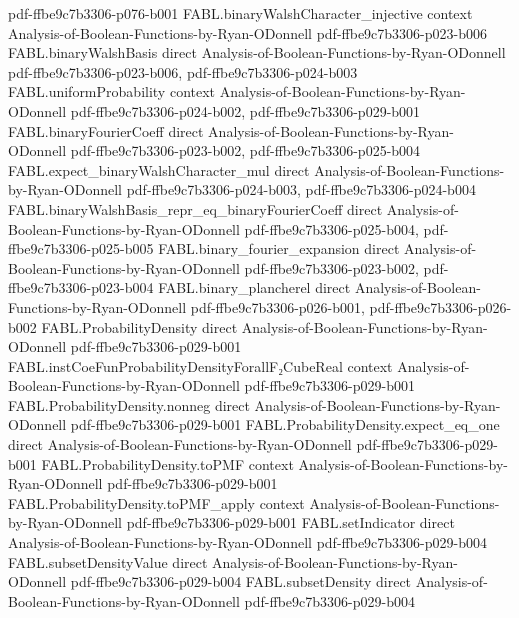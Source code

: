 \begin{theorem}
  {pdf-ffbe9c7b3306-p076-b001}
\proofstep
  {FABL.binaryWalshCharacter_injective}
  {context}
  {Analysis-of-Boolean-Functions-by-Ryan-ODonnell}
  {pdf-ffbe9c7b3306-p023-b006}
\proofstep
  {FABL.binaryWalshBasis}
  {direct}
  {Analysis-of-Boolean-Functions-by-Ryan-ODonnell}
  {pdf-ffbe9c7b3306-p023-b006,
    pdf-ffbe9c7b3306-p024-b003}
\proofstep
  {FABL.uniformProbability}
  {context}
  {Analysis-of-Boolean-Functions-by-Ryan-ODonnell}
  {pdf-ffbe9c7b3306-p024-b002,
    pdf-ffbe9c7b3306-p029-b001}
\proofstep
  {FABL.binaryFourierCoeff}
  {direct}
  {Analysis-of-Boolean-Functions-by-Ryan-ODonnell}
  {pdf-ffbe9c7b3306-p023-b002,
    pdf-ffbe9c7b3306-p025-b004}
\proofstep
  {FABL.expect_binaryWalshCharacter_mul}
  {direct}
  {Analysis-of-Boolean-Functions-by-Ryan-ODonnell}
  {pdf-ffbe9c7b3306-p024-b003,
    pdf-ffbe9c7b3306-p024-b004}
\proofstep
  {FABL.binaryWalshBasis_repr_eq_binaryFourierCoeff}
  {direct}
  {Analysis-of-Boolean-Functions-by-Ryan-ODonnell}
  {pdf-ffbe9c7b3306-p025-b004,
    pdf-ffbe9c7b3306-p025-b005}
\proofstep
  {FABL.binary_fourier_expansion}
  {direct}
  {Analysis-of-Boolean-Functions-by-Ryan-ODonnell}
  {pdf-ffbe9c7b3306-p023-b002,
    pdf-ffbe9c7b3306-p023-b004}
\proofstep
  {FABL.binary_plancherel}
  {direct}
  {Analysis-of-Boolean-Functions-by-Ryan-ODonnell}
  {pdf-ffbe9c7b3306-p026-b001,
    pdf-ffbe9c7b3306-p026-b002}
\proofstep
  {FABL.ProbabilityDensity}
  {direct}
  {Analysis-of-Boolean-Functions-by-Ryan-ODonnell}
  {pdf-ffbe9c7b3306-p029-b001}
\proofstep
  {FABL.instCoeFunProbabilityDensityForallF₂CubeReal}
  {context}
  {Analysis-of-Boolean-Functions-by-Ryan-ODonnell}
  {pdf-ffbe9c7b3306-p029-b001}
\proofstep
  {FABL.ProbabilityDensity.nonneg}
  {direct}
  {Analysis-of-Boolean-Functions-by-Ryan-ODonnell}
  {pdf-ffbe9c7b3306-p029-b001}
\proofstep
  {FABL.ProbabilityDensity.expect_eq_one}
  {direct}
  {Analysis-of-Boolean-Functions-by-Ryan-ODonnell}
  {pdf-ffbe9c7b3306-p029-b001}
\proofstep
  {FABL.ProbabilityDensity.toPMF}
  {context}
  {Analysis-of-Boolean-Functions-by-Ryan-ODonnell}
  {pdf-ffbe9c7b3306-p029-b001}
\proofstep
  {FABL.ProbabilityDensity.toPMF_apply}
  {context}
  {Analysis-of-Boolean-Functions-by-Ryan-ODonnell}
  {pdf-ffbe9c7b3306-p029-b001}
\proofstep
  {FABL.setIndicator}
  {direct}
  {Analysis-of-Boolean-Functions-by-Ryan-ODonnell}
  {pdf-ffbe9c7b3306-p029-b004}
\proofstep
  {FABL.subsetDensityValue}
  {direct}
  {Analysis-of-Boolean-Functions-by-Ryan-ODonnell}
  {pdf-ffbe9c7b3306-p029-b004}
\proofstep
  {FABL.subsetDensity}
  {direct}
  {Analysis-of-Boolean-Functions-by-Ryan-ODonnell}
  {pdf-ffbe9c7b3306-p029-b004}

\end{theorem}
